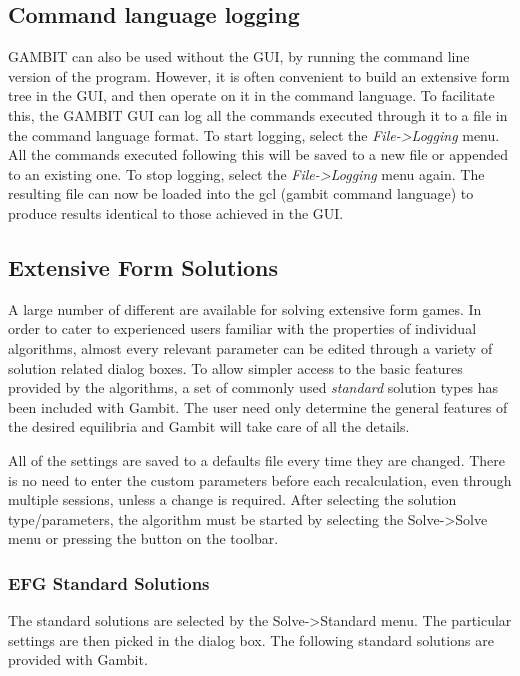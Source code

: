 \subsection{Command language logging}
GAMBIT can also be used without the GUI, by running the command line
version of the program.  However, it is often convenient to build an
extensive form tree in the GUI, and then operate on it in the command
language.  To facilitate this, the GAMBIT GUI can log all the commands
executed through it to a file in the command language format.  To start
logging, select the {\em File->Logging} menu.  All the commands executed
following this will be saved to a new file or appended to an existing one.
To stop logging, select the {\em File->Logging} menu again.  The resulting
file can now be loaded into the gcl (gambit command language) to produce
results identical to those achieved in the GUI.



\subsection{Extensive Form Solutions}
A large number of different  are 
available for solving extensive form
games.  In order to cater to experienced users familiar with the 
properties of individual algorithms, almost every relevant parameter can
be edited through a variety of solution related dialog boxes.  To allow 
simpler access to the basic features provided by the algorithms, a set of
commonly used {\em standard} solution types has been included with Gambit.
The user need only determine the general features of the desired equilibria
and Gambit will take care of all the details.

All of
the settings are saved to a defaults file every time they are changed. There
is no need to enter the custom parameters before each recalculation, even
through multiple sessions, unless a change is required.
After selecting the solution type/parameters, the algorithm must be started
by selecting the Solve->Solve menu or pressing the button on the toolbar.

\subsubsection{EFG Standard Solutions}\label{EFGStandardSolutions}
The standard solutions are selected by the Solve->Standard menu.  The
particular settings are then picked in the dialog box.
The following standard solutions are provided with Gambit.

